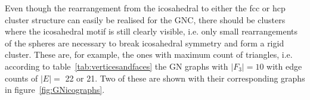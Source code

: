 Even though the rearrangement from the icosahedral to either the \ac{fcc} or
\ac{hcp} cluster structure can easily be realised for the \ac{GNC}, there should
be clusters where the icosahedral motif is still clearly visible, i.e. only
small rearrangements of the spheres are necessary to break icosahedral symmetry
and form a rigid cluster. These are, for example, the ones with maximum count of
triangles, i.e. according to table~\ref{tab:verticesandfaces} the GN graphs with
$|F_3|=10$ with edge counts of $|E|=$ 22 or 21. Two of these are shown with
their corresponding graphs in figure~\ref{fig:GNicographs}.
%
\begin{figure}[htb]
    \centering
    \\

\end{figure}
